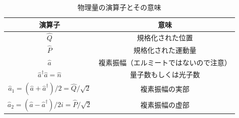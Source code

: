 \begin{table}
\caption{物理量の演算子とその意味}	
\begin{center}
\begin{tabular}{c c}
\hline
	演算子 & 意味 \\
	\hline \hline
	$\hat Q$ & 規格化された位置\\
	$\hat P$ & 規格化された運動量\\
	$\hat a$ & 複素振幅（エルミートではないので注意）\\
	$\hat a ^\dagger \hat a = \hat n$ & 量子数もしくは光子数\\
	$\hat a_1 = (\hat a + \hat a^\dagger)/2 = \hat Q/\sqrt 2$ & 複素振幅の実部\\
	$\hat a_2 = (\hat a - \hat a^\dagger)/2i = \hat P/\sqrt 2$ & 複素振幅の虚部\\
\hline
\end{tabular}
\label{table:operator_of_quantity}
\end{center}
\end{table}


